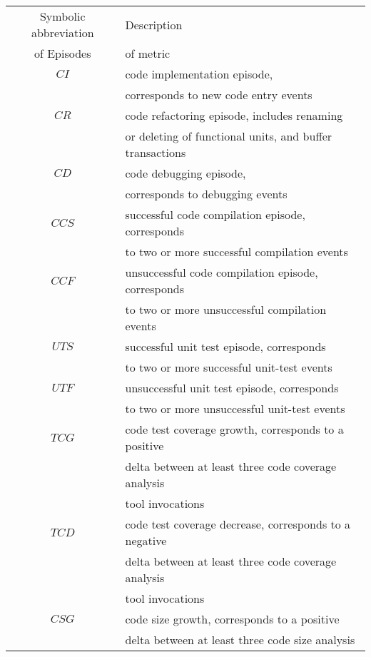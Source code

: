 \begin{table}
\begin{center}
    \begin{tabular}{ | c | l | }
    \hline
    Symbolic abbreviation 	& Description \\ 
    of Episodes 						& of metric	  \\ 
    \hline
    $CI$ 									& code implementation episode, \\ 
    											& corresponds to new code entry events \\
	  \hline
    $CR$ 									& code refactoring episode, includes renaming \\
    											& or deleting of functional units, and buffer transactions \\
    \hline
    $CD$ 									& code debugging episode, \\
    											& corresponds to debugging events \\
		\hline
		$CCS$ 								& successful code compilation episode, corresponds \\
													& to two or more successful compilation events \\
		\hline
		$CCF$ 								& unsuccessful code compilation episode, corresponds \\
													& to two or more unsuccessful compilation events \\
    \hline
		$UTS$ 								& successful unit test episode, corresponds \\
													& to two or more successful unit-test events \\
		\hline
		$UTF$ 							  & unsuccessful unit test episode, corresponds \\
													& to two or more unsuccessful unit-test events \\
		\hline
		$TCG$ 								& code test coverage growth, corresponds to a positive \\
													& delta between at least three code coverage analysis \\
													& tool invocations \\
		\hline
		$TCD$ 								& code test coverage decrease, corresponds to a negative \\
													& delta between at least three code coverage analysis \\
													& tool invocations \\
		\hline
		$CSG$ 								& code size growth, corresponds to a positive \\
													& delta between at least three code size analysis \\

\end{tabular}
\end{center}
\end{table}
